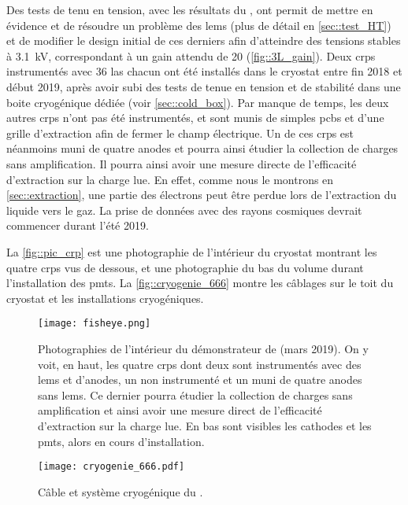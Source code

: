       Des tests de tenu en tension, avec les résultats du \TOO{}, ont permit de mettre en évidence et de résoudre un problème des \glspl{lem} (plus de détail en \autoref{sec::test_HT}) et de modifier le design initial de ces derniers afin d'atteindre des tensions stables à \SI{3.1}{\kilo\volt}, correspondant à un gain attendu de 20 (\autoref{fig::3L_gain}). Deux \glspl{crp} instrumentés avec 36 \gls{las} chacun ont été installés dans le cryostat entre fin 2018 et début 2019, après avoir subi des tests de tenue en tension et de stabilité dans une boite cryogénique dédiée (voir \autoref{sec::cold_box}). Par manque de temps, les deux autres \glspl{crp} n'ont pas été instrumentés, et sont munis de simples \glspl{pcb} et d'une grille d'extraction afin de fermer le champ électrique. Un de ces \glspl{crp} est néanmoins muni de quatre anodes et pourra ainsi étudier la collection de charges sans amplification. Il pourra ainsi avoir une mesure directe de l'efficacité d'extraction sur la charge lue. En effet, comme nous le montrons en \autoref{sec::extraction}, une partie des électrons peut être perdue lors de l'extraction du liquide vers le gaz. La prise de données avec des rayons cosmiques devrait commencer durant l'été 2019. 

      La \autoref{fig::pic_crp} est une photographie de l'intérieur du cryostat montrant les quatre \glspl{crp} vus de dessous, et une photographie du bas du volume durant l'installation des \glspl{pmt}. La \autoref{fig::cryogenie_666} montre les câblages sur le toit du cryostat et les installations cryogéniques.


      \begin{figure}[!htb]
        \centering
        \texttt{[image: fisheye.png]}        
        \caption[Photographie de l'intétrieur du démonstrateur de \SSS{}]{\label{fig::pic_crp}Photographies de l'intérieur du démonstrateur de \SSS{} (mars 2019). On y voit, en haut, les quatre \glspl{crp} dont deux sont instrumentés avec des \glspl{lem} et d'anodes, un non instrumenté et un muni de quatre anodes sans \glspl{lem}. Ce dernier pourra étudier la collection de charges sans amplification et ainsi avoir une mesure direct de l'efficacité d'extraction sur la charge lue. En bas sont visibles les cathodes et les \glspl{pmt}, alors en cours d'installation.}
      \end{figure}
      
      \begin{figure}[!htb]
        \centering
        \texttt{[image: cryogenie\_666.pdf]}
        \caption[Câble et système cryogénique du \SSS{}]{\label{fig::cryogenie_666}Câble et système cryogénique du \SSS{}.}
      \end{figure}

